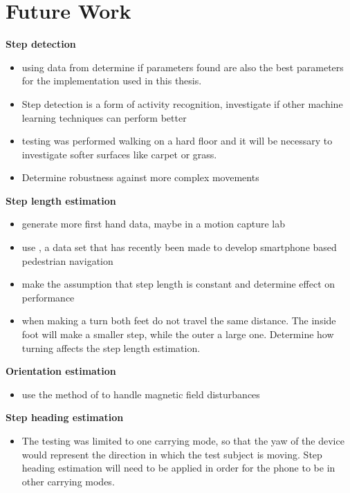 \section{Future Work}

{\color{purple}
\textbf{Step detection}
\begin{itemize}
	\item using data from \cite{Salvi2018} determine if parameters found are also the best parameters for the implementation used in this thesis.
	\item Step detection is a form of activity recognition, investigate if other machine learning techniques can perform better  
	\item testing was performed walking on a hard floor and it will be necessary to investigate softer surfaces like carpet or grass.
	\item Determine robustness against more complex movements
\end{itemize}

\textbf{Step length estimation}
\begin{itemize}
	\item generate more first hand data, maybe in a motion capture lab  
	\item use \cite{Bayev2019}, a data set that has recently been made to develop smartphone based pedestrian navigation 
	\item make the assumption that step length is constant and determine effect on performance
	\item when making a turn both feet do not travel the same distance. The inside foot will make a smaller step, while the outer a large one. Determine how turning affects the step length estimation.
\end{itemize}

\textbf{Orientation estimation}
\begin{itemize}
	\item use the method of \cite{Michel2018} to handle magnetic field disturbances
\end{itemize}

\textbf{Step heading estimation}
\begin{itemize}
	\item The testing was limited to one carrying mode, so that the yaw of the device would represent the direction in which the test subject is moving. Step heading estimation will need to be applied in order for the phone to be in other carrying modes.
\end{itemize}

}

